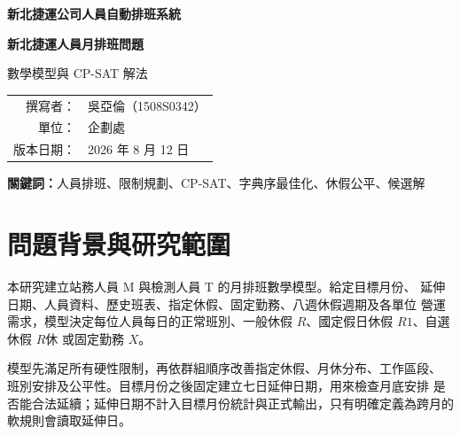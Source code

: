 \documentclass[a4paper,12pt]{article}
\begin{document}
\begin{titlepage}
  \centering
  \vspace*{3.2cm}
  {\Large\bfseries 新北捷運公司人員自動排班系統\par}
  \vspace{1.2cm}
  {\LARGE\bfseries\color{NtmcBlue} 新北捷運人員月排班問題\par}
  \vspace{0.4cm}
  {\Large 數學模型與 CP-SAT 解法\par}
  \vfill
  \begin{tabular}{rl}
    撰寫者：& 吳亞倫（1508S0342）\\
    單位：& 企劃處\\
    版本日期：& 2026 年 8 月 12 日
  \end{tabular}
  \vfill
\end{titlepage}

\begin{abstract}
  本文完整定義新北捷運第一版人員月排班問題，涵蓋站務 M 與檢測 T 兩個彼此獨立的
  限制規劃模型。輸入包括前月完整班表、本月需求、八週休假區間、指定休假、固定勤務、
  人員屬性與 M 萬年班表提示；輸出為最多三份合法候選班表及可解釋的違反量、權重與
  加權分數。兩個模型皆以 Google OR-Tools CP-SAT 建立離散變數，先滿足每日唯一狀態、
  十一小時工作間隔、七日一般休假與八週額度等硬限制，再以固定優先群組進行字典序
  最佳化。M 著重站點覆蓋、外援、工作型態與站群內公平；T 著重班組人力、專業與能力、
  跨月輪轉及休假公平。本文同時說明延伸七日、歷史邊界、萬年班表提示、時間上限、
  多 seed portfolio 與差異候選的實作方法，使問題定義、數學式與現行程式保持可追溯。
\end{abstract}

\noindent\textbf{關鍵詞：}人員排班、限制規劃、CP-SAT、字典序最佳化、休假公平、候選解

\tableofcontents
\clearpage

\section{問題背景與研究範圍}

本研究建立站務人員 M 與檢測人員 T 的月排班數學模型。給定目標月份、
延伸日期、人員資料、歷史班表、指定休假、固定勤務、八週休假週期及各單位
營運需求，模型決定每位人員每日的正常班別、一般休假 \(R\)、國定假日休假
\(R1\)、自選休假 \(R休\) 或固定勤務 \(X\)。

模型先滿足所有硬性限制，再依群組順序改善指定休假、月休分布、工作區段、
班別安排及公平性。目標月份之後固定建立七日延伸日期，用來檢查月底安排
是否能合法延續；延伸日期不計入目標月份統計與正式輸出，只有明確定義為跨月的
軟規則會讀取延伸日。
\end{document}
